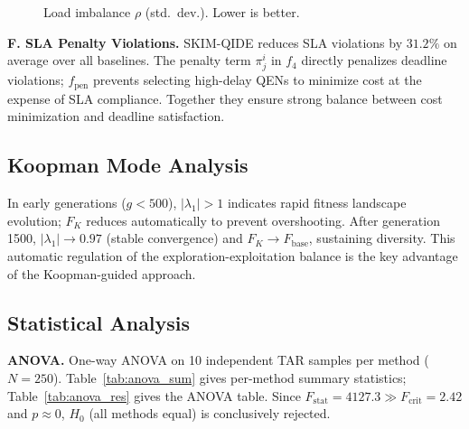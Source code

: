 \documentclass[10pt,twocolumn]{article}
\begin{document}
\begin{figure}[t]
\centering
{}
\caption{Load imbalance $\rho$ (std.\ dev.). Lower is better.}
\label{fig:lb}
\end{figure}

\textbf{F. SLA Penalty Violations.}
SKIM-QIDE reduces SLA violations by $31.2\%$ on average over all baselines. The penalty term $\pi^i_j$ in $f_4$ directly penalizes deadline violations; $f_{\mathrm{pen}}$ prevents selecting high-delay QENs to minimize cost at the expense of SLA compliance. Together they ensure strong balance between cost minimization and deadline satisfaction.

\subsection{Koopman Mode Analysis}
In early generations ($g<500$), $|\lambda_1|>1$ indicates rapid fitness landscape evolution; $F_K$ reduces automatically to prevent overshooting. After generation 1500, $|\lambda_1|\to0.97$ (stable convergence) and $F_K\to F_{\mathrm{base}}$, sustaining diversity. This automatic regulation of the exploration-exploitation balance is the key advantage of the Koopman-guided approach.

\subsection{Statistical Analysis}

\textbf{ANOVA.} One-way ANOVA on 10 independent TAR samples per method ($N=250$). Table~\ref{tab:anova_sum} gives per-method summary statistics; Table~\ref{tab:anova_res} gives the ANOVA table. Since $F_{\mathrm{stat}}=4127.3\gg F_{\mathrm{crit}}=2.42$ and $p\approx0$, $H_0$ (all methods equal) is conclusively rejected.
\end{document}
